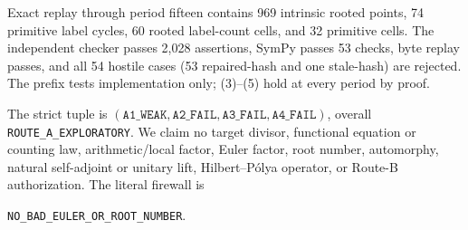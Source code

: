 \documentclass[10pt]{article}
\begin{document}
Exact replay through period fifteen contains 969 intrinsic rooted points, 74
primitive label cycles, 60 rooted label-count cells, and 32 primitive cells.
The independent checker passes 2,028 assertions, SymPy passes 53 checks, byte
replay passes, and all 54 hostile cases (53 repaired-hash and one stale-hash)
are rejected.  The prefix tests implementation only; (3)--(5) hold at every
period by proof.

The strict tuple is $(\texttt{A1\_WEAK},\texttt{A2\_FAIL},
\texttt{A3\_FAIL},\texttt{A4\_FAIL})$, overall
\texttt{ROUTE\_A\_EXPLORATORY}.  We claim no target divisor, functional
equation or counting law, arithmetic/local factor, Euler factor, root number,
automorphy, natural self-adjoint or unitary lift, Hilbert--P\'olya operator, or
Route-B authorization.  The literal firewall is
\begin{center}
\texttt{NO\_BAD\_EULER\_OR\_ROOT\_NUMBER}.
\end{center}
\end{document}
